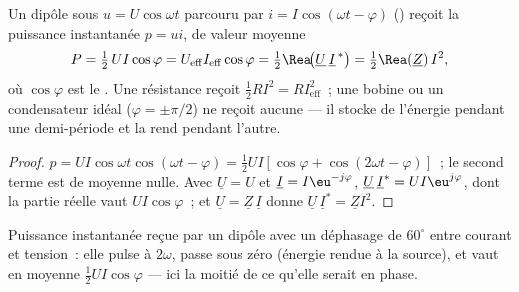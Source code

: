 \begin{theorem}\label{thm:b1:sinusoidal-impedance:power}
Un dipôle sous $u = U\cos\omega t$ parcouru par $i = I\cos(\omega t - \varphi)$
() reçoit la puissance instantanée $p = ui$, de
valeur moyenne
\[
P = \tfrac12\,UI\cos\varphi = U_{\mathrm{eff}}I_{\mathrm{eff}}\cos\varphi
= \tfrac12\Rea\!\big(\underline U\,\underline I^{\,*}\big) = \tfrac12\Rea(\underline Z)\,I^2,
\]
où $\cos\varphi$ est le \emph{}. Une résistance
reçoit $\tfrac12 RI^2 = RI_{\mathrm{eff}}^2$~; une bobine ou un
condensateur idéal ($\varphi = \pm\pi/2$) ne reçoit aucune  --- il stocke de l'énergie pendant une demi-période et la rend
pendant l'autre.
\end{theorem}

\begin{proof}
$p = UI\cos\omega t\cos(\omega t - \varphi) = \tfrac12 UI[\cos\varphi +
\cos(2\omega t - \varphi)]$~; le second terme est de moyenne nulle. Avec
$\underline U = U$ et $\underline I = I\eu^{-j\varphi}$,
$\underline U\,\underline I^* = UI\eu^{j\varphi}$, dont la partie réelle
vaut $UI\cos\varphi$~; et $\underline U = \underline Z\,\underline I$ donne
$\underline U\,\underline I^* = \underline Z I^2$.
\end{proof}

\begin{omfigure}

{\small Puissance instantanée reçue par un dipôle avec un déphasage de
$60^\circ$ entre courant et tension~: elle pulse à $2\omega$, passe sous
zéro (énergie rendue à la source), et vaut en moyenne
$\tfrac12 UI\cos\varphi$ --- ici la moitié de ce qu'elle serait en phase.}
\end{omfigure}

